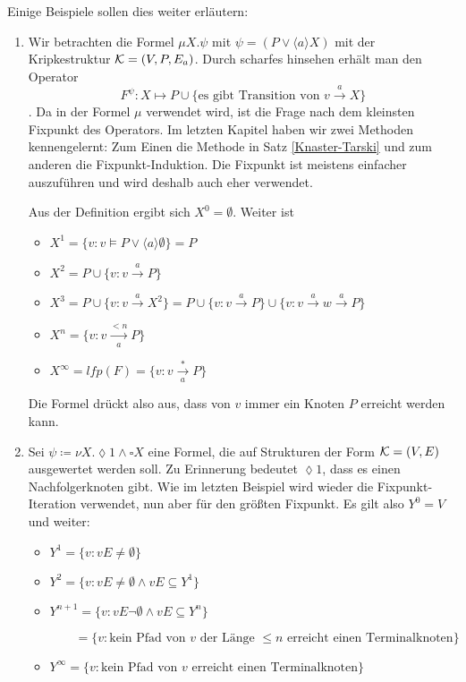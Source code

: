Einige Beispiele sollen dies weiter erläutern:
\begin{enumerate}
	\item Wir betrachten die Formel $\mu X . \psi$ mit $\psi= (P \lor \langle a \rangle X)$ mit der Kripkestruktur $\mathcal{K}=(V,P,E_a)$. Durch scharfes hinsehen erhält man den Operator $$F^\psi :X \mapsto P \cup \{\text{es gibt Transition von } v \xrightarrow{a} X\}$$. Da in der Formel $\mu$ verwendet wird, ist die Frage nach dem kleinsten Fixpunkt des Operators. 
	Im letzten Kapitel haben wir zwei Methoden kennengelernt: Zum Einen die Methode in Satz \ref{Knaster-Tarski} und zum anderen die Fixpunkt-Induktion. Die Fixpunkt ist meistens einfacher auszuführen und wird deshalb auch eher verwendet.
	
	Aus der Definition ergibt sich $X^0=\emptyset$. Weiter ist
	\begin{itemize}
		\item $X^1=\{v : v \models P \lor \langle a \rangle \emptyset\}=P$
		\item $X^2=P \cup \{v : v \xrightarrow{a} P\}$
		\item $X^3=P \cup \{v : v\xrightarrow{a} X^2\}=P\cup \{v : v\xrightarrow{a}P\} \cup \{v : v\xrightarrow{a}w\xrightarrow{a}P\}$
		\item $X^n=\{v: v \xrightarrow[a]{<n} P\}$
		\item $X^\infty = lfp(F) = \{v : v \xrightarrow[a]{\ast} P\}$
	\end{itemize}
	
	Die Formel drückt also aus, dass von $v$ immer ein Knoten $P$ erreicht werden kann.
	
	\item Sei $\psi\coloneqq \nu X. \lozenge 1 \land \square X$ eine Formel, die auf Strukturen der Form $\mathcal{K}=(V,E)$ ausgewertet werden soll. Zu Erinnerung bedeutet $\lozenge 1$, dass es einen Nachfolgerknoten gibt. Wie im letzten Beispiel wird wieder die Fixpunkt-Iteration verwendet, nun aber für den größten Fixpunkt. Es gilt also $Y^0=V$ und weiter:
	\begin{itemize}
		\item $Y^1 = \{v : vE\neq\emptyset\}$
		\item $Y^2 = \{v : vE\neq\emptyset \land vE \subseteq Y^1\}$
		\item $Y^{n+1} = \{v : vE\neg\emptyset \land vE\subseteq Y^n\}$ 
		
		$\qquad= \{v : \text{kein Pfad von } v \text{ der Länge } \leq n \text{ erreicht einen Terminalknoten}\}$
		\item $Y^\infty = \{v : \text{kein Pfad von } v \text{ erreicht einen Terminalknoten}\}$
	\end{itemize}
	

\end{enumerate}
